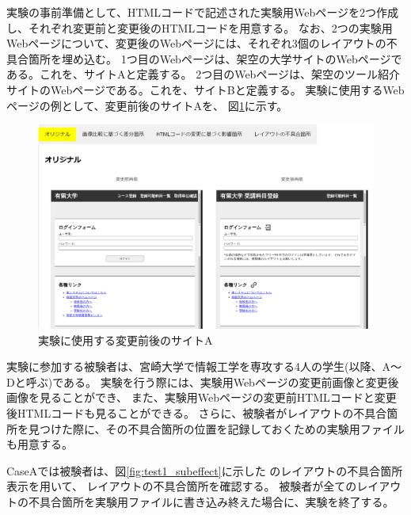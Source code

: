 実験の事前準備として、HTMLコードで記述された実験用Webページを2つ作成し、それぞれ変更前と変更後のHTMLコードを用意する。
なお、2つの実験用Webページについて、変更後のWebページには、それぞれ3個のレイアウトの不具合箇所を埋め込む。
1つ目のWebページは、架空の大学サイトのWebページである。これを、サイトAと定義する。
2つ目のWebページは、架空のツール紹介サイトのWebページである。これを、サイトBと定義する。
実験に使用するWebページの例として、変更前後のサイトAを、
図\ref{fig:test1}に示す。
\begin{figure}[tp]
    \centering
    \includegraphics[width=1.0\textwidth]{image/original_test.png}
    \caption{実験に使用する変更前後のサイトA}
    \label{fig:test1}
\end{figure}
実験に参加する被験者は、宮崎大学で情報工学を専攻する4人の学生(以降、A～Dと呼ぶ)である。
実験を行う際には、実験用Webページの変更前画像と変更後画像を見ることができ、
また、実験用Webページの変更前HTMLコードと変更後HTMLコードも見ることができる。
さらに、被験者がレイアウトの不具合箇所を見つけた際に、その不具合箇所の位置を記録しておくための実験用ファイルも用意する。
\par
CaseAでは被験者は、図\ref{fig:test1_subeffect}に示した
\toolName のレイアウトの不具合箇所表示を用いて、
レイアウトの不具合箇所を確認する。
被験者が全てのレイアウトの不具合箇所を実験用ファイルに書き込み終えた場合に、実験を終了する。
